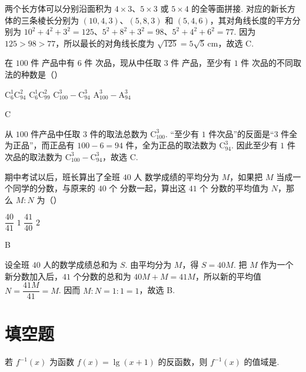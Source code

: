 \begin{solution}
两个长方体可以分别沿面积为 \(4\times3\)、\(5\times3\) 或 \(5\times4\) 的全等面拼接. 对应的新长方体的三条棱长分别为 \((10,4,3)\)、\((5,8,3)\) 和 \((5,4,6)\)，其对角线长度的平方分别为 \(10^2+4^2+3^2=125\)、\(5^2+8^2+3^2=98\)、\(5^2+4^2+6^2=77\). 因为 \(125>98>77\)，所以最长的对角线长度为 \(\sqrt{125}=5\sqrt{5}\,\mathrm{cm}\)，故选 C.
\end{solution}

\begin{problem}
在 \(100\text{ 件}\) 产品中有 \(6\text{ 件}\) 次品，现从中任取 \(3\text{ 件}\) 产品，至少有 \(1\text{ 件}\) 次品的不同取法的种数是（\quad）

\choices
    {\(\mathrm C_6^1\mathrm C_{94}^2\)}
    {\(\mathrm C_6^1\mathrm C_{99}^2\)}
    {\(\mathrm C_{100}^3-\mathrm C_{94}^3\)}
    {\(\mathrm A_{100}^3-\mathrm A_{94}^3\)}
\end{problem}

\begin{answer}
C
\end{answer}

\begin{solution}
从 \(100\) 件产品中任取 \(3\) 件的取法总数为 \(\mathrm C_{100}^{3}\). “至少有 \(1\) 件次品”的反面是“\(3\) 件全为正品”，而正品有 \(100-6=94\) 件，全为正品的取法数为 \(\mathrm C_{94}^{3}\). 因此至少有 \(1\) 件次品的取法数为 \(\mathrm C_{100}^{3}-\mathrm C_{94}^{3}\)，故选 C.
\end{solution}

\begin{problem}
期中考试以后，班长算出了全班 \(40\text{ 人}\) 数学成绩的平均分为 \(M\)，如果把 \(M\) 当成一个同学的分数，与原来的 \(40\text{ 个}\) 分数一起，算出这 \(41\text{ 个}\) 分数的平均值为 \(N\)，那么 \(M:N\) 为（\quad）

\choices
    {\(\dfrac{40}{41}\)}
    {\(1\)}
    {\(\dfrac{41}{40}\)}
    {\(2\)}
\end{problem}

\begin{answer}
B
\end{answer}

\begin{solution}
设全班 \(40\) 人的数学成绩总和为 \(S\). 由平均分为 \(M\)，得 \(S=40M\). 把 \(M\) 作为一个新分数加入后，\(41\) 个分数的总和为 \(40M+M=41M\)，所以新的平均值 \(N=\dfrac{41M}{41}=M\). 因而 \(M:N=1:1=1\)，故选 B.
\end{solution}

\section{填空题}
\begin{problem}
若 \(f^{-1}(x)\) 为函数 \(f(x)=\lg(x+1)\) 的反函数，则 \(f^{-1}(x)\) 的值域是\fillinblank{}.
\end{problem}

